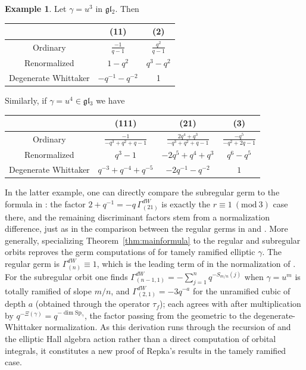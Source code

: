 \documentclass{amsart}
\numberwithin{equation}{section}
\theoremstyle{definition}
\newtheorem{example}[lemma]{Example}%
\def\Sp{{\mathrm{Sp}}}
\newcommand{\fl}{\mathfrak{l}}
\newcommand{\fg}{\mathfrak{g}}
\begin{document}
\begin{example}
    Let $\gamma=u^3$ in $\fg\fl_2$. Then 
    
    \vspace{0.2cm}
    \begin{center}
    \begin{tabular}{|c|c|c|}
    \hline
 & (11) & (2) \\ \hline
                Ordinary  & $\frac{-1}{q - 1}$ & $\frac{q^2}{q - 1}$\\\hline
        Renormalized & $1-q^2$ & $q^3-q^2$   \\ \hline
        Degenerate Whittaker&  $-q^{-1}-q^{-2}$ & 1\\ \hline
    \end{tabular}
\end{center}
\vspace{0.2cm}

Similarly, if 
$\gamma=u^4\in \fg\fl_3$ we have

\vspace{0.2cm}
    \begin{center}
    \begin{tabular}{|c|c|c|c|}
    \hline
 & (111) & (21) & (3) \\ \hline
                Ordinary  & $\frac{-1}{-q^{3} + q^{2} + q - 1}$ & $\frac{2 q^{4} + q^{3}}{-q^{3} + q^{2} + q - 1}$ &  $\frac{-q^{5}}{-q^{2} + 2 q - 1}$ \\\hline
        Renormalized & $q^{3} - 1$  & $-2 q^{5} + q^{4} + q^{3}$
 & $q^{6} - q^{5}$  \\ \hline
        Degenerate Whittaker& $q^{-3}+q^{-4}+q^{-5}$  & $-2q^{-1}-q^{-2}$ & $1$ \\ \hline
    \end{tabular}
\end{center}
\vspace{0.2cm}

In the latter example, one can directly compare the subregular germ to the formula in \cite[(10.2)]{Repka}: the factor $2+q^{-1}=-q\,\Gamma^{dW}_{(21)}$ is exactly the $r\equiv 1\ (\mathrm{mod}\ 3)$ case there, and the remaining discriminant factors stem from a normalization difference, just as in the comparison between the regular germs in \cite{Shelstad} and \cite{Repka1}. More generally, specializing Theorem~\ref{thm:mainformula} to the regular and subregular orbits reproves the germ computations of \cite{Repka1,Repka} for tamely ramified elliptic $\gamma$. The regular germ is $\Gamma^{dW}_{(n)}\equiv 1$, which is the leading term of \cite{Repka1} in the normalization of \cite{Shelstad}. For the subregular orbit one finds $\Gamma^{dW}_{(n-1,1)}=-\sum_{j=1}^{n}q^{-S_{m/n}(j)}$ when $\gamma=u^m$ is totally ramified of slope $m/n$, and $\Gamma^{dW}_{(2,1)}=-3q^{-a}$ for the unramified cubic of depth $a$ (obtained through the operator $\tau_f$); each agrees with \cite[\S10]{Repka} after multiplication by $q^{-\Xi(\gamma)}=q^{-\dim\Sp_\gamma}$, the factor passing from the geometric to the degenerate-Whittaker normalization. As this derivation runs through the recursion of \cite{W2} and the elliptic Hall algebra action rather than a direct computation of orbital integrals, it constitutes a new proof of Repka's results in the tamely ramified case.
\end{example}
\end{document}
